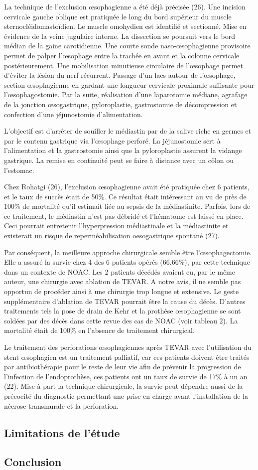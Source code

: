 \documentclass[./tfe.tex]{subfiles}
\begin{document}
La technique de l’exclusion œsophagienne a été déjà précisée (26). Une incision cervicale gauche oblique est pratiquée le long du bord supérieur du muscle sternocléidomastoïdien. Le muscle omohydien est identifié et sectionné. Mise en évidence de la veine jugulaire interne. La dissection se poursuit vers le bord médian de la gaine carotidienne. Une courte sonde naso-œsophagienne provisoire permet de palper l’œsophage entre la trachée en avant et la colonne cervicale postérieurement. Une mobilisation minutieuse circulaire de l’œsophage permet d’éviter la lésion du nerf récurrent. Passage d’un lacs autour de l’œsophage, section œsophagienne en gardant une longueur cervicale proximale suffisante pour l’œsophagostomie. Par la suite, réalisation d’une laparotomie médiane, agrafage de la jonction œsogastrique, pyloroplastie, gastrostomie de décompression et confection d’une jéjunostomie d’alimentation.

L’objectif est d’arrêter de souiller le médiastin par de la salive riche en germes et par le contenu gastrique via l’œsophage perforé. La jéjunostomie sert à l’alimentation et la gastrostomie ainsi que la pyloroplastie assurent la vidange gastrique. La remise en continuité peut se faire à distance avec un côlon ou l’estomac.

Chez Rohatgi (26), l’exclusion œsophagienne avait été pratiquée chez 6 patients, et le taux de succès était de 50\%. Ce résultat était intéressant au vu de près de 100\% de mortalité qu’il estimait liée au sepsis de la médiastinite. Parfois, lors de ce traitement, le médiastin n’est pas débridé et l’hématome est laissé en place. Ceci pourrait entretenir l’hyperpression médiastinale et la médiastinite et existerait un risque de reperméabilisation oesogastrique spontané (27).

Par conséquent, la meilleure approche chirurgicale semble être l’œsophagectomie. Elle a assuré la survie chez 4 des 6 patients opérés (66.66\%), par cette technique dans un contexte de NOAC. Les 2 patients décédés avaient eu, par le même auteur, une chirurgie avec ablation de TEVAR. A notre avis, il ne semble pas opportun de procéder ainsi à une chirurgie trop longue et extensive. Le geste supplémentaire d’ablation de TEVAR pourrait être la cause du décès.
D’autres traitements tels la pose de drain de Kehr et la prothèse œsophagienne se sont soldées par des décès dans cette revue des cas de NOAC (voir tableau 2). La mortalité était de 100\% en l’absence de traitement chirurgical.

Le traitement des perforations œsophagiennes après TEVAR avec l'utilisation du stent œsophagien est un traitement palliatif, car ces patients doivent être traités par antibiothérapie pour le reste de leur vie afin de prévenir la progression de l'infection de l'endoprothèse, ces patients ont un taux de survie de 17\% à un an (22).
Mise à part la technique chirurgicale, la survie peut dépendre aussi de la précocité du diagnostic permettant une prise en charge avant l’installation de la nécrose transmurale et la perforation.

\subsection*{Limitations de l’étude}


\subsection*{Conclusion}

\end{document}
